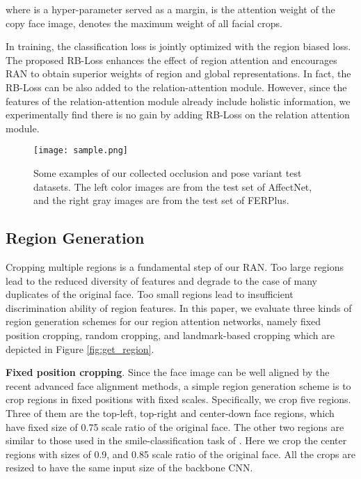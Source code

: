 \documentclass[journal]{IEEEtran}
\newcommand{\pxj}[1]{\textcolor[rgb]{0,0,0}{#1}}
\begin{document}
where  is a hyper-parameter served as a margin,  is the attention weight of the copy face image,  denotes the maximum weight of all facial crops.

In training, the classification loss is jointly optimized with the region biased loss. The proposed RB-Loss enhances the effect of region attention and encourages RAN to obtain superior weights of region and global representations. In fact, the RB-Loss can be also added to the relation-attention module. However, since the features of the relation-attention module already include holistic information, we experimentally find there is no gain by adding RB-Loss on the relation attention module.

\begin{figure*}[htp]
\centering
\texttt{[image: sample.png]}  
\caption{Some examples of our collected occlusion and pose variant test datasets. The left color images are from the test set of AffectNet, and the right gray images are from  the test set of  FERPlus.}
\label{fig:pose_occlusion_dataset}
\end{figure*}

\subsection{Region Generation}
Cropping multiple regions is a fundamental step of our RAN. Too large regions lead to the reduced diversity of features and degrade to the case of many duplicates of the original face. Too small regions lead to insufficient discrimination ability of region features. In this paper, we evaluate three kinds of region generation schemes for our region attention networks, namely fixed position cropping,  random cropping, and landmark-based cropping which are depicted in Figure \ref{fig:get_region}. 


\textbf{Fixed position cropping}.
Since the face image can be well aligned by the recent advanced face alignment methods, a simple region generation scheme is to crop regions in fixed positions with fixed scales. Specifically, \pxj{we crop five regions. Three of them are the top-left, top-right and center-down face regions, which have fixed size of 0.75 scale ratio of the original face. The other two regions are similar to those used in the smile-classification task of \cite{zhang2016gender}. Here we crop the center regions with sizes of 0.9, and 0.85 scale ratio of the original face.} All the crops are resized to have the same input size of the backbone CNN. 
\end{document}

